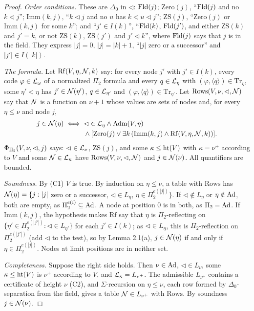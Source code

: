 \documentclass[11pt]{article}
\begin{document}
\begin{proof}
\emph{Order conditions.} These are $\Delta_0$ in $\lhd$: $\mathrm{Fld}(j)$; $\mathrm{Zero}(j)$, ``$\mathrm{Fld}(j)$ and no $k \lhd
j$''; $\mathrm{Imm}(k,j)$, ``$k \lhd j$ and no $u$ has $k \lhd u \lhd j$''; $\mathrm{ZS}(j)$, ``$\mathrm{Zero}(j)$ or
$\mathrm{Imm}(k,j)$ for some $k$''; and ``$j' \in I(k)$'', ``$\mathrm{Fld}(k)$, $\mathrm{Fld}(j')$, and either $\mathrm{ZS}(k)$ and
$j' = k$, or not $\mathrm{ZS}(k)$, $\mathrm{ZS}(j')$ and $j' \lhd k$'', where $\mathrm{Fld}(j)$ says that $j$ is in the field.
They express $|j| = 0$, $|j| = |k|+1$, ``$|j|$ zero or a successor'' and $|j'| \in I(|k|)$.

\emph{The formula.} Let $\mathrm{Rf}(V,\eta,\mathcal{N},k)$ say: for every node $j'$ with $j' \in I(k)$, every code $\varphi
\in \mathcal{L}_\omega$ of a normalized $\Pi_2$ formula and every $q \in \mathcal{L}_\eta$ with $(\varphi, \langle q\rangle) \in
\mathrm{Tr}_\eta$, some $\eta' < \eta$ has $j' \in \mathcal{N}(\eta')$, $q \in \mathcal{L}_{\eta'}$ and $(\varphi, \langle q\rangle)
\in \mathrm{Tr}_{\eta'}$. Let $\mathrm{Rows}(V,\nu,\lhd,\mathcal{N})$ say that $\mathcal{N}$ is a function on $\nu+1$ whose values are
sets of nodes and, for every $\eta \le \nu$ and node $j$,
\[ \begin{aligned} j \in \mathcal{N}(\eta) \iff{} & \lhd \in \mathcal{L}_\eta \wedge \mathrm{Adm}(V,\eta) \\ & \wedge
   [\mathrm{Zero}(j) \vee \exists k\, (\mathrm{Imm}(k,j) \wedge \mathrm{Rf}(V,\eta,\mathcal{N},k))]. \end{aligned} \]
$\Phi_{\Pi_2}(V,\nu,\lhd,j)$ says: $\lhd \in \mathcal{L}_\nu$, $\mathrm{ZS}(j)$, and some $\kappa \le \mathrm{ht}(V)$ with $\kappa = \nu^+$
according to $V$ and some $\mathcal{N} \in \mathcal{L}_\kappa$ have $\mathrm{Rows}(V,\nu,\lhd,\mathcal{N})$ and $j \in \mathcal{N}(\nu)$. All
quantifiers are bounded.

\emph{Soundness.} By (C1) $V$ is true. By induction on $\eta \le \nu$, a table with $\mathrm{Rows}$ has $\mathcal{N}(\eta) =
\{j : |j|$ zero or a successor, $\lhd \in L_\eta$, $\eta \in \Pi_2^{e(|j|)}\}$. If $\lhd \notin L_\eta$ or $\eta \notin \mathrm{Ad}$,
both are empty, as $\Pi_2^{e(i)} \subseteq \mathrm{Ad}$. A node at position $0$ is in both, as $\Pi_2 = \mathrm{Ad}$. If $\mathrm{Imm}(k,j)$, the
hypothesis makes $\mathrm{Rf}$ say that $\eta$ is $\Pi_2$-reflecting on $\{\eta' \in \Pi_2^{e(|j'|)} : \lhd \in
L_{\eta'}\}$ for each $j' \in I(k)$; as $\lhd \in L_\eta$, this is $\Pi_2$-reflection on $\Pi_2^{e(|j'|)}$ (add $\lhd$ to the
test), so by
Lemma 2.1(a), $j \in \mathcal{N}(\eta)$ if and only if $\eta \in \Pi_2^{e(|j|)}$. Nodes at limit positions are in neither set.

\emph{Completeness.} Suppose the right side holds. Then $\nu \in \mathrm{Ad}$, $\lhd \in L_\nu$, some $\kappa \le \mathrm{ht}(V)$ is
$\nu^+$ according to $V$, and $\mathcal{L}_\kappa = L_{\nu^+}$. The admissible $L_{\nu^+}$ contains a certificate of height
$\nu$ (C2), and $\Sigma$-recursion on $\eta \le \nu$, each row formed by $\Delta_0$-separation from the field, gives a
table $\mathcal{N} \in L_{\nu^+}$ with $\mathrm{Rows}$. By soundness $j \in \mathcal{N}(\nu)$.
\end{proof}
\end{document}
